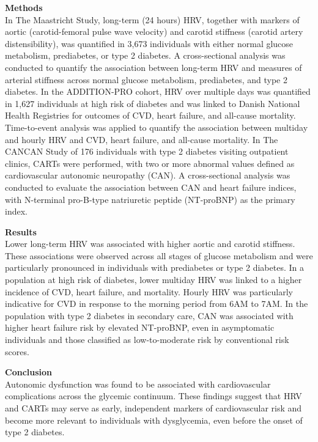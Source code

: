 \documentclass[
  a4paper,
  headsepline=true,
  open=left]{scrbook}
\begin{document}
\textbf{Methods}\\
In The Maastricht Study, long-term (24 hours) HRV, together with markers
of aortic (carotid-femoral pulse wave velocity) and carotid stiffness
(carotid artery distensibility), was quantified in 3,673 individuals
with either normal glucose metabolism, prediabetes, or type 2 diabetes.
A cross-sectional analysis was conducted to quantify the association
between long-term HRV and measures of arterial stiffness across normal
glucose metabolism, prediabetes, and type 2 diabetes. In the
ADDITION-PRO cohort, HRV over multiple days was quantified in 1,627
individuals at high risk of diabetes and was linked to Danish National
Health Registries for outcomes of CVD, heart failure, and all-cause
mortality. Time-to-event analysis was applied to quantify the
association between multiday and hourly HRV and CVD, heart failure, and
all-cause mortality. In The CANCAN Study of 176 individuals with type 2
diabetes visiting outpatient clinics, CARTs were performed, with two or
more abnormal values defined as cardiovascular autonomic neuropathy
(CAN). A cross-sectional analysis was conducted to evaluate the
association between CAN and heart failure indices, with N-terminal
pro-B-type natriuretic peptide (NT-proBNP) as the primary index.

\textbf{Results}\\
Lower long-term HRV was associated with higher aortic and carotid
stiffness. These associations were observed across all stages of glucose
metabolism and were particularly pronounced in individuals with
prediabetes or type 2 diabetes. In a population at high risk of
diabetes, lower multiday HRV was linked to a higher incidence of CVD,
heart failure, and mortality. Hourly HRV was particularly indicative for
CVD in response to the morning period from 6AM to 7AM. In the population
with type 2 diabetes in secondary care, CAN was associated with higher
heart failure risk by elevated NT-proBNP, even in asymptomatic
individuals and those classified as low-to-moderate risk by conventional
risk scores.

\textbf{Conclusion}\\
Autonomic dysfunction was found to be associated with cardiovascular
complications across the glycemic continuum. These findings suggest that
HRV and CARTs may serve as early, independent markers of cardiovascular
risk and become more relevant to individuals with dysglycemia, even
before the onset of type 2 diabetes.

\clearpage
\null
\thispagestyle{empty}
\clearpage
\end{document}
